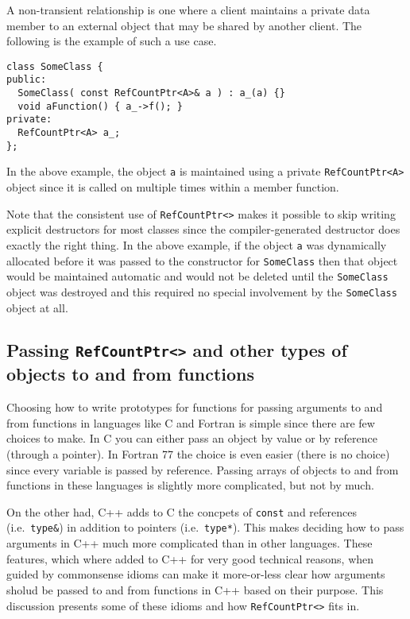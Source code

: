 A non-transient relationship is one where a client maintains a private
data member to an external object that may be shared by another
client.  The following is the example of such a use case.
%
{\scriptsize\begin{verbatim}
class SomeClass {
public:
  SomeClass( const RefCountPtr<A>& a ) : a_(a) {}
  void aFunction() { a_->f(); }
private:
  RefCountPtr<A> a_;
};
\end{verbatim}}
%
\noindent{}
In the above example, the object {}\texttt{a} is maintained using a
private {}\texttt{RefCountPtr<A>} object since it is called on multiple
times within a member function.

Note that the consistent use of {}\texttt{RefCountPtr<>} makes it
possible to skip writing explicit destructors for most classes since
the compiler-generated destructor does exactly the right thing.  In
the above example, if the object {}\texttt{a} was dynamically
allocated before it was passed to the constructor for
{}\texttt{SomeClass} then that object would be maintained automatic
and would not be deleted until the {}\texttt{SomeClass} object was
destroyed and this required no special involvement by the
{}\texttt{SomeClass} object at all.

%
\subsection{Passing {}\texttt{RefCountPtr<>} and other types of objects to and from functions}
\label{rcp:sec:passing-args}
%

Choosing how to write prototypes for functions for passing arguments
to and from functions in languages like C and Fortran is simple since
there are few choices to make.  In C you can either pass an object by
value or by reference (through a pointer).  In Fortran 77 the choice
is even easier (there is no choice) since every variable is passed by
reference.  Passing arrays of objects to and from functions in these
languages is slightly more complicated, but not by much.

On the other had, C++ adds to C the concpets of {}\texttt{const} and
references (i.e.~{}\texttt{type\&}) in addition to pointers
(i.e.~{}\texttt{type*}).  This makes deciding how to pass arguments in
C++ much more complicated than in other languages.  These features,
which where added to C++ for very good technical reasons, when guided
by commonsense idioms can make it more-or-less clear how arguments
sholud be passed to and from functions in C++ based on their purpose.
This discussion presents some of these idioms and how
{}\texttt{RefCountPtr<>} fits in.

